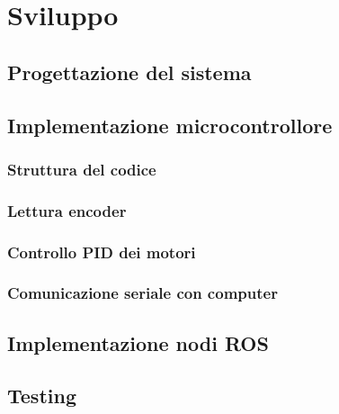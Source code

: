 \chapter{Sviluppo}

\section{Progettazione del sistema}

\section{Implementazione microcontrollore}
\subsection{Struttura del codice}
\subsection{Lettura encoder}
\subsection{Controllo PID dei motori}
\cite{cross_pid}
\subsection{Comunicazione seriale con computer}
\section{Implementazione nodi ROS}
\section{Testing}
